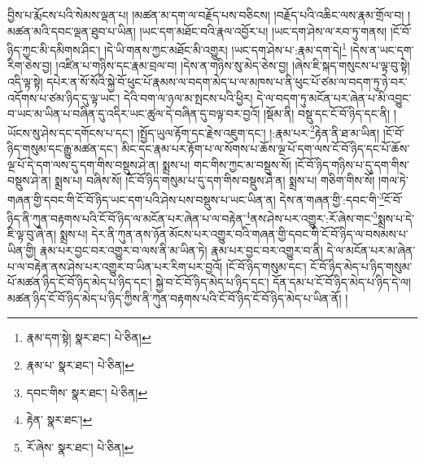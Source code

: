 བྱིས་པ་རྨོངས་པའི་སེམས་ལྡན་པ། །མཚན་མ་དག་ལ་བརྗོད་པས་བཅིངས། །བརྗོད་པའི་འཆིང་ལས་རྣམ་གྲོལ་བ། །མཚན་མའི་དབང་ལྡན་ཐུབ་པ་ཡིན། །ཡང་དག་མཐོང་བའི་རྣལ་འབྱོར་པ། །ཡང་དག་ཤེས་ལ་རབ་ཏུ་གནས། །ངོ་བོ་ཉིད་ཀྱང་མི་དམིགས་ཤིང་། །དེ་ཡི་གནས་ཀྱང་མཐོང་མི་འགྱུར། །ཡང་དག་ཤེས་པ་:རྣམ་དག་དེ།\footnote{རྣམ་དག་སྟེ།  སྣར་ཐང་།  པེ་ཅིན། } །དེས་ན་ཡང་དག་རིག་ཅེས་བྱ། །འཛིན་པ་གཉིས་དང་རྣམ་བྲལ་བ། །དེས་ན་གཉིས་སུ་མེད་ཅེས་བྱ། །ཞེས་ཇི་སྐད་གསུངས་པ་ལྟ་བུ་སྟེ། འདི་ལྟ་སྟེ། དཔེར་ན་སོ་སོའི་སྐྱེ་བོ་ཕུང་པོ་རྣམས་ལ་བདག་མེད་པ་ལ་མཁས་པ་ནི་ཕུང་པོ་ཙམ་ལ་བདག་ཏུ་ཉེ་བར་འདོགས་པ་ཙམ་ཉིད་དུ་ལྟ་ཡང་། དེའི་བག་ལ་ཉལ་མ་སྤངས་པའི་ཕྱིར། དེ་ལ་བདག་ཏུ་མངོན་པར་ཞེན་པ་མི་འབྱུང་བ་ཡང་མ་ཡིན་པ་བཞིན་དུ་འདིར་ཡང་ཚུལ་དེ་བཞིན་དུ་བལྟ་བར་བྱའོ། །སྡོམ་ནི། བསྡུ་དང་ངོ་བོ་ཉིད་དང་ནི། །ཡོངས་སུ་ཤེས་དང་དགོངས་པ་དང་། །སྤྱོད་ཡུལ་རྟོག་དང་རྗེས་འཇུག་དང་། །:རྣམ་པར་\footnote{རྣམ་པ་  སྣར་ཐང་།  པེ་ཅིན། }རྟེན་ནི་ཐ་མ་ཡིན། །ངོ་བོ་ཉིད་གསུམ་དང་རྒྱུ་མཚན་དང་། མིང་དང་རྣམ་པར་རྟོག་པ་ལ་སོགས་པ་ཆོས་ལྔ་པོ་དག་ལས་ངོ་བོ་ཉིད་དང་པོ་ཆོས་ལྔ་པོ་དེ་དག་ལས་དུ་དག་གིས་བསྡུས་ཤེ་ན། སྨྲས་པ། གང་གིས་ཀྱང་མ་བསྡུས་སོ། །ངོ་བོ་ཉིད་གཉིས་པ་དུ་དག་གིས་བསྡུས་ཤེ་ན། སྨྲས་པ། བཞིས་སོ། །ངོ་བོ་ཉིད་གསུམ་པ་དུ་དག་གིས་བསྡུས་ཤེ་ན། སྨྲས་པ། གཅིག་གིས་སོ། །གལ་ཏེ་གཞན་གྱི་དབང་གི་ངོ་བོ་ཉིད་ཡང་དག་པའི་ཤེས་པས་བསྡུས་པ་ཡང་ཡིན་ན། དེས་ན་གཞན་གྱི་:དབང་གི་\footnote{དབང་གིས་  སྣར་ཐང་།  པེ་ཅིན། }ངོ་བོ་ཉིད་ནི་ཀུན་བརྟགས་པའི་ངོ་བོ་ཉིད་ལ་མངོན་པར་ཞེན་པ་ལ་བརྟེན་\footnote{རྟེན་  སྣར་ཐང་། }ནས་ཤེས་པར་འགྱུར་:རོ་ཞེས་གང་\footnote{རོ་ཞེས་  སྣར་ཐང་།  པེ་ཅིན། }སྨྲས་པ་དེ་ཇི་ལྟ་བུ་ཞེ་ན། སྨྲས་པ། དེར་ནི་ཀུན་ནས་ཉོན་མོངས་པར་འགྱུར་བའི་གཞན་གྱི་དབང་གི་ངོ་བོ་ཉིད་ལ་བསམས་པ་ཡིན་གྱི། རྣམ་པར་བྱང་བར་འགྱུར་བ་ལས་ནི་མ་ཡིན་ཏེ། རྣམ་པར་བྱང་བར་འགྱུར་བ་ནི། དེ་ལ་མངོན་པར་མ་ཞེན་པ་ལ་བརྟེན་ནས་ཤེས་པར་འགྱུར་བ་ཡིན་པར་རིག་པར་བྱའོ། །ངོ་བོ་ཉིད་གསུམ་དང་། ངོ་བོ་ཉིད་མེད་པ་ཉིད་གསུམ་པོ་མཚན་ཉིད་ངོ་བོ་ཉིད་མེད་པ་ཉིད་དང་། སྐྱེ་བ་ངོ་བོ་ཉིད་མེད་པ་ཉིད་དང་། དོན་དམ་པ་ངོ་བོ་ཉིད་མེད་པ་ཉིད་དེ་ལ། མཚན་ཉིད་ངོ་བོ་ཉིད་མེད་པ་ཉིད་ཀྱིས་ནི་ཀུན་བརྟགས་པའི་ངོ་བོ་ཉིད་ངོ་བོ་ཉིད་མེད་པ་ཡིན་ནོ། །
